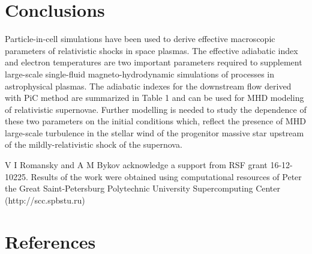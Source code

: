 \documentclass[a4paper]{jpconf}
\begin{document}
	
	\section{Conclusions}
	
	Particle-in-cell simulations have been used to derive effective macroscopic parameters of relativistic shocks in space plasmas. The effective adiabatic index and electron temperatures are two important parameters required to supplement large-scale single-fluid magneto-hydrodynamic simulations of processes in astrophysical plasmas. The adiabatic indexes for the downstream flow derived with PiC method are summarized in Table 1 and can be used for MHD modeling of relativistic
	supernovae. Further modelling is needed to study the dependence of these two parameters on the initial conditions which, reflect the presence of MHD large-scale turbulence in the stellar wind of the progenitor massive star upstream of the  mildly-relativistic shock of the supernova. 
	
	\ack
	V I Romansky and A M Bykov acknowledge a support from RSF grant 16-12-10225.
	Results of the work were obtained using computational resources of Peter the Great Saint-Petersburg Polytechnic University Supercomputing Center (http://scc.spbstu.ru)
	
	\section*{References}
	

	
\end{document}
